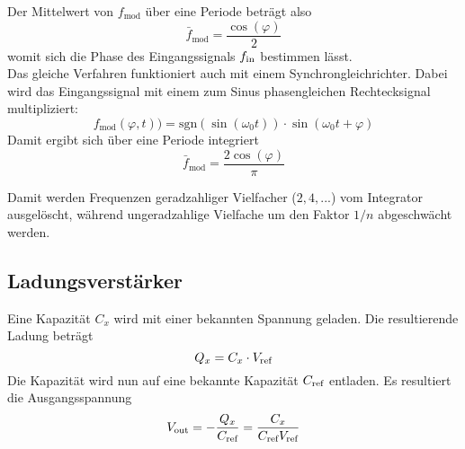 Der Mittelwert von $f_{\text{mod}}$ über eine Periode beträgt also
\begin{equation*}
	\bar{f}_{\text{mod}} = \frac{\cos(\varphi)}{2}
\end{equation*}
womit sich die Phase des Eingangssignals $f_{\operatorname{\text{in}}}$ bestimmen lässt. \\

Das gleiche Verfahren funktioniert auch mit einem Synchrongleichrichter. 
Dabei wird das Eingangssignal mit einem zum Sinus phasengleichen Rechtecksignal
multipliziert:
\begin{equation*}
	f_{\text{mod}}(\varphi,t)) = \text{sgn}\left(\sin(\omega_0 t)\right) \cdot \sin(\omega_0 t + \varphi)
\end{equation*}
Damit ergibt sich über eine Periode integriert
\begin{equation*}
	\bar{f}_{\text{mod}} = \frac{2 \cos(\varphi)}{\pi}
\end{equation*}

Damit werden Frequenzen geradzahliger Vielfacher ($2,4,...$) vom Integrator
ausgelöscht, während ungeradzahlige Vielfache um den Faktor $1/n$
abgeschwächt werden.

\subsection{Ladungsverstärker}
Eine Kapazität $C_x$ wird mit einer bekannten Spannung geladen. Die resultierende
Ladung beträgt
\begin{equation*}
	Q_x = C_x \cdot V_{\operatorname{\text{ref}}}
\end{equation*}
Die Kapazität wird nun auf eine bekannte Kapazität $C_{\operatorname{\text{ref}}}$ entladen. 
Es resultiert die Ausgangsspannung
\begin{equation*}
	V_{\operatorname{\text{out}}} = - \frac{Q_x}{C_{\operatorname{\text{ref}}}} = \frac{C_x}{C_{\operatorname{\text{ref}}} V_{\operatorname{\text{ref}}}}
\end{equation*}